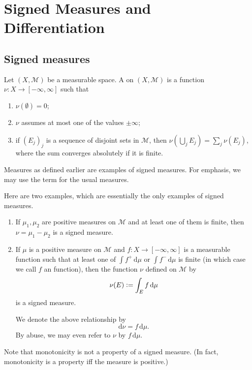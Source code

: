 \documentclass[12pt]{article}	%
\begin{document}
\section{Signed Measures and Differentiation}

\subsection{Signed measures}

\begin{defn}
	Let $(X, \mathcal{M})$ be a measurable space. A  on $(X, \mathcal{M})$ is a function $\nu : X \to [-\infty, \infty]$ such that
	\begin{enumerate}
		\item $\nu(\emptyset) = 0$;
		\item $\nu$ assumes at most one of the values $\pm \infty$;
		\item if $(E_{j})_{j}$ is a sequence of disjoint sets in $\mathcal{M}$, then $\nu(\bigcup_{j} E_{j}) = \sum_{j} \nu(E_{j})$, where the sum converges absolutely if it is finite.
	\end{enumerate}
\end{defn}
Measures as defined earlier are examples of signed measures. For emphasis, we may use the term  for the usual measures.

\begin{ex}
	Here are two examples, which are essentially the only examples of signed measures.
	\begin{enumerate}
		\item If $\mu_{1}, \mu_{2}$ are positive measures on $\mathcal{M}$ and at least one of them is finite, then $\nu = \mu_{1} - \mu_{2}$ is a signed measure.
		\item If $\mu$ is a positive measure on $\mathcal{M}$ and $f : X \to [-\infty, \infty]$ is a measurable function such that at least one of $\int f^{+} \,{\mathrm d}\mu$ or $\int f^{-} \,{\mathrm d}\mu$ is finite (in which case we call $f$ an  function), then the function $\nu$ defined on $\mathcal{M}$ by
		\begin{equation*} 
			\nu(E) \vcentcolon= \int_{E} f \,{\mathrm{d}}\mu
		\end{equation*}
		is a signed measure.

		We denote the above relationship by
		\begin{equation} \label{eq:002}
			{\mathrm d}\nu = f \,{\mathrm d}\mu.
		\end{equation}
		By abuse, we may even refer to $\nu$ by $f \,{\mathrm d}\mu$.
	\end{enumerate}
\end{ex}
\begin{rem}
	Note that monotonicity is not a property of a signed measure. (In fact, monotonicity is a property iff the measure is positive.)
\end{rem}
\end{document}
